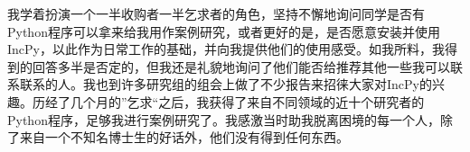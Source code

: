 \documentclass[letter,12pt]{book}
\begin{document}
\begin{CJK}{UTF8}{gbsn}
我学着扮演一个一半收购者一半乞求者的角色，坚持不懈地询问同学是否有Python程序可以拿来给我用作案例研究，或者更好的是，是否愿意安装并使用IncPy，以此作为日常工作的基础，并向我提供他们的使用感受。如我所料，我得到的回答多半是否定的，但我还是礼貌地询问了他们能否给推荐其他一些我可以联系联系的人。我也到许多研究组的组会上做了不少报告来招徕大家对IncPy的兴趣。历经了几个月的”乞求“之后，我获得了来自不同领域的近十个研究者的Python程序，足够我进行案例研究了。我感激当时助我脱离困境的每一个人，除了来自一个不知名博士生的好话外，他们没有得到任何东西。

\breakline





\clearpage
\clearpage

\end{CJK}
\end{document}
